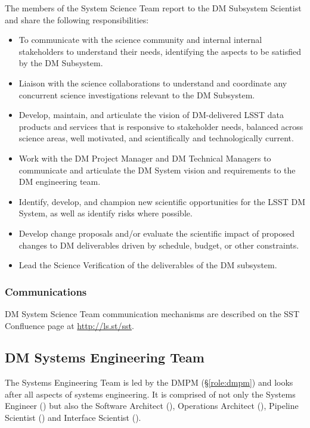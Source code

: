 The members of the System Science Team report to the DM Subsystem Scientist and share the following responsibilities:
\begin{itemize}
\item To communicate with the science community and internal internal stakeholders to understand their needs, identifying the aspects to be satisfied by the DM Subsystem.
\item Liaison with the science collaborations to understand and coordinate any concurrent science investigations relevant to the DM Subsystem.
\item Develop, maintain, and articulate the vision of DM-delivered LSST data products and services that is responsive to stakeholder needs, balanced across science areas, well motivated, and scientifically and technologically current.
\item Work with the DM Project Manager and DM Technical Managers to communicate and articulate the DM System vision and requirements to the DM engineering team.
\item Identify, develop, and champion new scientific opportunities for the LSST DM System, as well as identify risks where possible.
\item Develop change proposals and/or evaluate the scientific impact of proposed changes to DM deliverables driven by schedule, budget, or other constraints.
\item Lead the Science Verification of the deliverables of the DM subsystem.
\end{itemize}

\subsubsection{Communications}

DM System Science Team communication mechanisms are described on the SST Confluence page at \url{http://ls.st/sst}.

\subsection{DM Systems Engineering Team \label{sect:sysengt}}

The Systems Engineering Team is led by the DMPM (\S\ref{role:dmpm}) and looks after all aspects of systems engineering.
It is comprised of not only the Systems Engineer () but also the Software Architect (), Operations Architect (), Pipeline Scientist () and Interface Scientist ().

